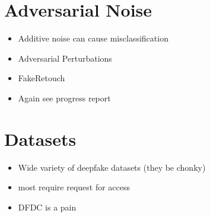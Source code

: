 \section{Adversarial Noise}

\begin{itemize}
    \item Additive noise can cause misclassification
    \item Adversarial Perturbations
    \item FakeRetouch
    \item Again see progress report
\end{itemize}

\section{Datasets}

\begin{itemize}
    \item Wide variety of deepfake datasets (they be chonky)
    \item most require request for access
    \item DFDC is a pain
\end{itemize}